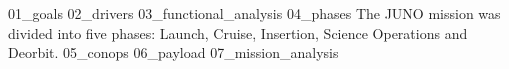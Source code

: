 {01_goals}
{02_drivers}
{03_functional_analysis}
{04_phases}
The JUNO mission was divided into five phases: Launch, Cruise, Insertion, Science Operations and Deorbit.
{05_conops}
{06_payload}
{07_mission_analysis}